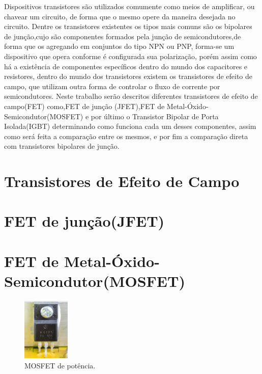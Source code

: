 \documentclass[12pt]{article}
\begin{document}
    Dispositivos transistores são utilizados comumente como meios de amplificar, ou chavear um circuito, de forma que o mesmo opere da maneira desejada no circuito. Dentre os transistores existentes os tipos mais comuns são os bipolares de junção,cujo são componentes formados pela junção de semicondutores,de forma que os agregando em conjuntos do tipo NPN ou PNP, forma-se um dispositivo que opera conforme é configurada sua polarização, porém assim como há a existência de componentes específicos dentro do mundo dos capacitores e resistores, dentro do mundo dos transistores existem os transistores de efeito de campo, que utilizam outra forma de controlar o fluxo de corrente por semicondutores. Neste trabalho serão descritos diferentes transistores de efeito de campo(FET) como,FET de junção (JFET),FET de Metal-Óxido-Semicondutor(MOSFET) e por último o Transistor Bipolar de Porta Isolada(IGBT) determinando como funciona cada um desses componentes, assim como será feita a comparação entre os mesmos, e por fim a comparação direta com transistores bipolares de junção.

\newpage

\section{Transistores de Efeito de Campo}

\section{FET de junção(JFET)}

\section{FET de Metal-Óxido-Semicondutor(MOSFET)}

        \begin{figure}[htpb!]

            \centering
            \includegraphics[width=0.2\textwidth]{./images/Dell_Professional_P2212H_-_power_supply_board_-_K4101FS-2149.jpg}
            \caption{MOSFET de potência.}

        \end{figure}
\end{document}
